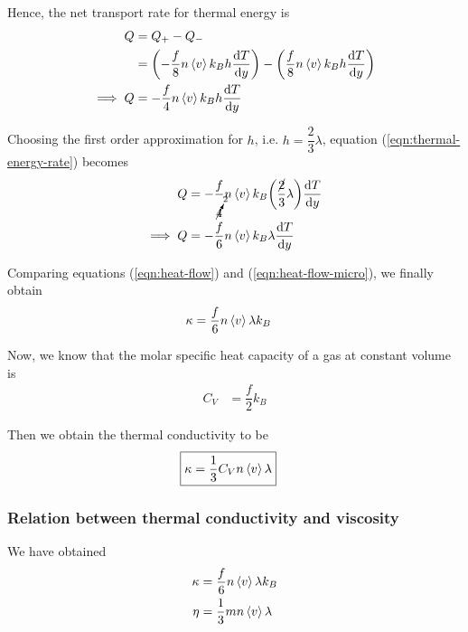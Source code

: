 		Hence, the net transport rate for thermal energy is
		\begin{align}
			Q&=Q_+-Q_- \nonumber\\
				&=\qty(-\dfrac{f}{8}n\expval{v}k_Bh\dv{T}{y})-\qty(\dfrac{f}{8}n\expval{v}k_Bh\dv{T}{y}) \nonumber\\
			\implies Q&=-\dfrac{f}{4}n\expval{v}k_Bh\dv{T}{y} \label{eqn:thermal-energy-rate}
		\end{align}
		
		Choosing the first order approximation for $h$, i.e. $h=\dfrac{2}{3}\lambda$, equation (\ref{eqn:thermal-energy-rate}) becomes
		\begin{align}
			Q&=-\dfrac{f}{\cancelto{2}{4}}n\expval{v}k_B\qty(\dfrac{\cancel{2}}{3}\lambda)\dv{T}{y} \nonumber\\
			\implies Q&=-\dfrac{f}{6}n\expval{v}k_B\lambda\dv{T}{y} \label{eqn:heat-flow-micro}
		\end{align}
		
		Comparing equations (\ref{eqn:heat-flow}) and (\ref{eqn:heat-flow-micro}), we finally obtain
		\begin{align*}
			\kappa&=\dfrac{f}{6}n\expval{v}\lambda k_B
		\end{align*}
		
		Now, we know that the molar specific heat capacity of a gas at constant volume is
		\begin{align*}
			C_V&=\dfrac{f}{2}k_B
		\end{align*}
		
		Then we obtain the thermal conductivity to be
		\begin{align*}
			\Aboxed{\kappa&=\dfrac{1}{3}C_Vn\expval{v}\lambda}
		\end{align*}
		
		\subsubsection{Relation between thermal conductivity and viscosity}
			We have obtained
			\begin{align*}
				\kappa&=\dfrac{f}{6}n\expval{v}\lambda k_B \\
				\eta&=\dfrac{1}{3}mn\expval{v}\lambda
			\end{align*}
			
